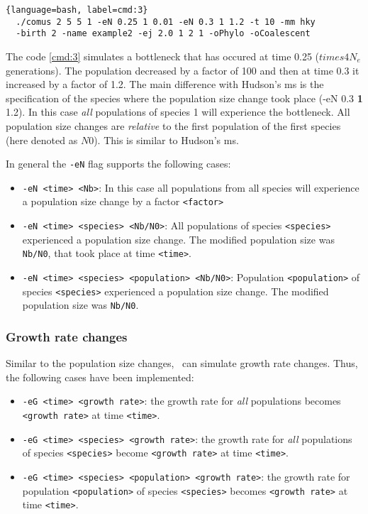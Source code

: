\begin{lstlisting}[label=cmd:3, caption={Command line to produce a bottleneck within one species}]{language=bash, label=cmd:3}
  ./comus 2 5 5 1 -eN 0.25 1 0.01 -eN 0.3 1 1.2 -t 10 -mm hky 
  -birth 2 -name example2 -ej 2.0 1 2 1 -oPhylo -oCoalescent
\end{lstlisting}

The code \ref{cmd:3} simulates a bottleneck that has occured at time 0.25 ($times 4 N_e$ generations). The population decreased by a factor of 100 and then at time 0.3 it increased by a factor of 1.2. The main difference with Hudson's ms is the specification of the species where the population size change took place (-eN 0.3 {\bf 1} 1.2). In this case \emph{all} populations of species 1 will experience the bottleneck. All population size changes are \emph{relative} to the first population of the first species (here denoted as $N0$). This is similar to Hudson's ms. 

In general the \verb!-eN! flag supports the following cases:

\begin{itemize}
\item \verb!-eN <time> <Nb>!: In this case all populations from all species will experience a population size change by a factor \verb!<factor>!
\item \verb!-eN <time> <species> <Nb/N0>!: All populations of species \verb!<species>! experienced a population size change. The modified population size was \verb!Nb/N0!, that took place at time \verb!<time>!.
\item \verb!-eN <time> <species> <population> <Nb/N0>!: Population \verb!<population>! of species \verb!<species>! experienced a population size change. The modified population size was \verb!Nb/N0!. 
\end{itemize} 

\subsubsection{Growth rate changes}
Similar to the population size changes, \comus\ can simulate growth rate changes. Thus, the following cases have been implemented:

\begin{itemize}
\item \verb!-eG <time> <growth rate>!: the growth rate for \emph{all} populations becomes \verb!<growth rate>! at time \verb!<time>!. 
\item \verb!-eG <time> <species> <growth rate>!: the growth rate for \emph{all} populations of species \verb!<species>! become \verb!<growth rate>! at time \verb!<time>!. 
\item \verb!-eG <time> <species> <population> <growth rate>!: the growth rate for population \verb!<population>! of species \verb!<species>! becomes \verb!<growth rate>! at time \verb!<time>!. 
\end{itemize}


